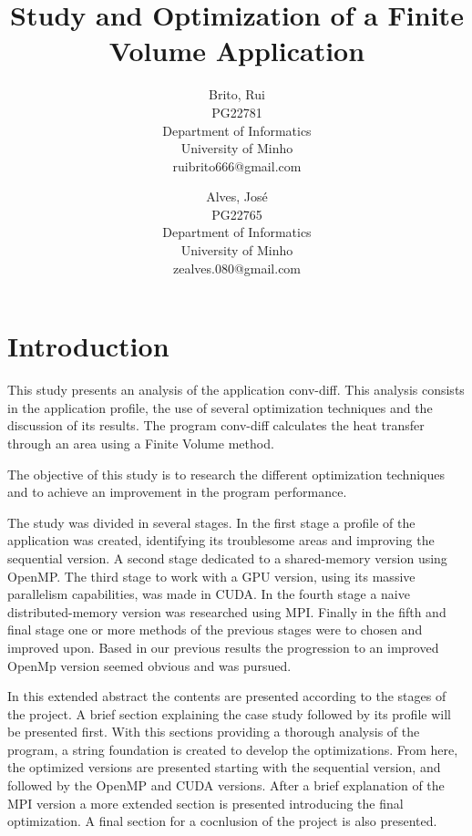 \documentclass[a4paper,10pt,openright,openbib,twocolumn]{article}
\begin{document}
\begin{multicols}{2}
\title{Study and Optimization of a Finite Volume Application}
\author{
    Brito, Rui\\
    PG22781\\
    Department of Informatics\\
    University of Minho\\
    ruibrito666@gmail.com
  \and
    Alves, José\\
    PG22765\\
    Department of Informatics\\
    University of Minho\\
    zealves.080@gmail.com
}
\date{}
\maketitle
\end{multicols}

\section{Introduction}

This study presents an analysis of the application conv-diff. This analysis consists in the application profile, the use of several optimization techniques and the discussion of its results.
The program conv-diff calculates the heat transfer through an area using a Finite Volume method.

The objective of this study is to research the different optimization techniques and to achieve an improvement in the program performance.

The study was divided in several stages.
In the first stage a profile of the application was created, identifying its troublesome areas and improving the sequential version.
A second stage dedicated to a shared-memory version using OpenMP.
The third stage to work with a GPU version, using its massive parallelism capabilities, was made in CUDA.
In the fourth stage a naive distributed-memory version was researched using MPI.
Finally in the fifth and final stage one or more methods of the previous stages were to chosen and improved upon. Based in our previous results the progression to an improved OpenMp version seemed obvious and was pursued.

In this extended abstract the contents are presented according to the stages of the project. 
A brief section explaining the case study followed by its profile will be presented first. With this sections providing a thorough analysis of the program, a string foundation is created to develop the optimizations. From here, the optimized versions are presented starting with the sequential version, and followed by the OpenMP and CUDA versions. 
After a brief explanation of the MPI version a more extended section is presented introducing the final optimization. 
A final section for a cocnlusion of the project is also presented.
\end{document}

